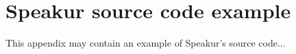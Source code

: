 \chapter{Speakur source code example}
%

This appendix may contain an example of Speakur's source code...


